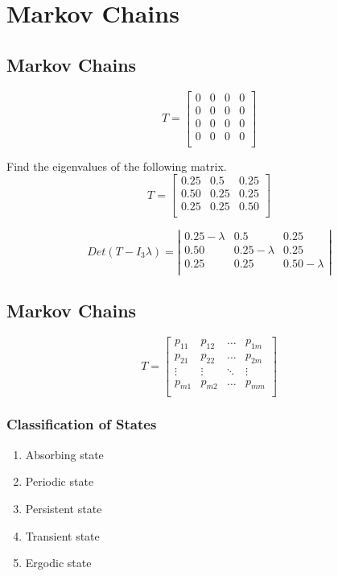 \chapter{Markov Chains}
\section{Markov Chains}

\[
T= \left[ \begin{array}{cccc} 0 & 0 & 0 & 0 \\ 0 & 0 & 0 & 0 \\0 & 0 & 0 & 0 \\0 & 0 & 0 & 0 \\
\end{array} \right]
\]

Find the eigenvalues of the following matrix.
\[
T= \left[ \begin{array}{ccc} 0.25 & 0.5 & 0.25  \\ 0.50 & 0.25 & 0.25   \\0.25 & 0.25 & 0.50   \\
\end{array} \right]
\]

\[
Det(T-I_3\lambda)= \left| \begin{array}{ccc} 0.25-\lambda & 0.5 & 0.25  \\ 0.50 & 0.25-\lambda & 0.25   \\0.25 & 0.25 & 0.50-\lambda   \\
\end{array} \right|
\]


\newpage



\section{Markov Chains}

\[
T= \left[ \begin{array}{cccc} p_{11} & p_{12} & \dots & p_{1m} \\
p_{21} & p_{22} & \dots & p_{2m} \\\vdots & \vdots & \ddots &
\vdots
\\ p_{m1} & p_{m2} & \dots & p_{mm} \\
\end{array} \right]
\]


\subsection{Classification of States}
\begin{enumerate}
	\item Absorbing state \item Periodic state \item Persistent state
	\item Transient state \item Ergodic state
\end{enumerate}



